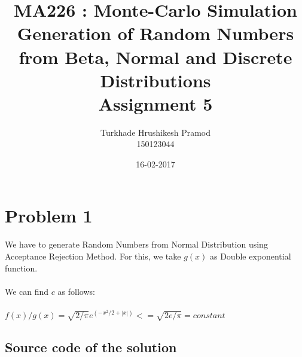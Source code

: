 \documentclass{article}
\title{%
	MA226 : Monte-Carlo Simulation\\
	 Generation of Random Numbers from Beta, Normal and Discrete Distributions\\
	 \large Assignment 5}
\date{16-02-2017}
\author{%
	Turkhade Hrushikesh Pramod\\
	150123044	}
\begin{document}
	\maketitle
	
	\newpage
	
	\section{Problem 1}
	\paragraph{}
		We have to generate Random Numbers from Normal Distribution using Acceptance Rejection Method. For this, we take $g(x)$ as Double exponential function.
		
		\paragraph{}
		We can find $c$ as follows:
		\paragraph{}
		$f(x)/g(x)=\sqrt{2/\pi}e^{(-x^2/2+\left | x \right |)}<=\sqrt{2e/\pi}=constant$
			
			
		
	\subsection{Source code of the solution}
		
		
		\pagebreak
\end{document}
